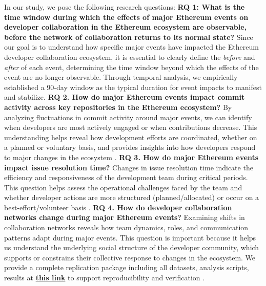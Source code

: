 In our study, we pose the following research questions:
\newline
\textbf{RQ 1: What is the time window during which the effects of major Ethereum events on developer collaboration in the Ethereum ecosystem are observable, before the network of collaboration returns to its normal state?}
Since our goal is to understand how specific major events have impacted the Ethereum developer collaboration ecosystem, it is essential to clearly define the \textit{before} and \textit{after} of each event, determining the time window beyond which the effects of the event are no longer observable. Through temporal analysis, we empirically established a 90-day window as the typical duration for event impacts to manifest and stabilize.
\newline
\textbf{RQ 2. How do major Ethereum events impact commit activity across key repositories in the Ethereum ecosystem?}
By analyzing fluctuations in commit activity around major events, we can identify when developers are most actively engaged or when contributions decrease. This understanding helps reveal how development efforts are coordinated, whether on a planned or voluntary basis, and provides insights into how developers respond to major changes in the ecosystem \cite{8115619}.
\newline
\textbf{RQ 3. How do major Ethereum events impact issue resolution time?}
Changes in issue resolution time indicate the efficiency and responsiveness of the development team during critical periods. This question helps assess the operational challenges faced by the team and whether developer actions are more structured (planned/allocated) or occur on a best-effort/volunteer basis \cite{1205177}.
\newline
\textbf{RQ 4. How do developer collaboration networks change during major Ethereum events?}
Examining shifts in collaboration networks reveals how team dynamics, roles, and communication patterns adapt during major events. This question is important because it helps us understand the underlying social structure of the developer community, which supports or constrains their collective response to changes in the ecosystem. We provide a complete replication package including all datasets, analysis scripts, results  at  \href{https://figshare.com/articles/journal_contribution/_b_Mining_a_Decade_of_Event_Impacts_on_Contributor_Dynamics_in_Ethereum_A_Longitudinal_Study_b_-_MSR_2025/27629559/1}{\textbf{this link}} to support reproducibility and verification \cite{Vaccargiu2025}.





